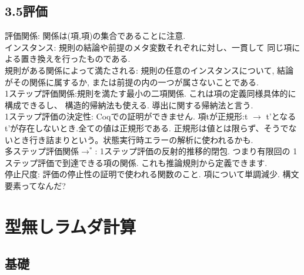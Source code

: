\documentclass[a4paper,10pt]{article}
\begin{document}
\subsection*{3.5評価}
評価関係: 関係は(項,項)の集合であることに注意.\\
インスタンス: 規則の結論や前提のメタ変数それぞれに対し、一貫して
同じ項による置き換えを行ったものである.\\
規則がある関係によって満たされる: 規則の任意のインスタンスについて,
結論がその関係に属するか, または前提の内の一つが属さないことである.\\
1ステップ評価関係:規則を満たす最小の二項関係. これは項の定義同様具体的に構成できるし、
構造的帰納法も使える. 導出に関する帰納法と言う. \\
1ステップ評価の決定性: Coqでの証明ができません.
項tが正規形:t $\rightarrow$ t'となるt'が存在しないとき.全ての値は正規形である. 
正規形は値とは限らず、そうでないとき行き詰まりという。状態実行時エラーの解析に使われるかも. \\
多ステップ評価関係$\rightarrow^*$: 1ステップ評価の反射的推移的閉包. つまり有限回の
1ステップ評価で到達できる項の関係. これも推論規則から定義できます. \\
停止尺度: 評価の停止性の証明で使われる関数のこと. 項について単調減少.
構文要素ってなんだ?
\section*{型無しラムダ計算}
\subsection*{基礎}
\end{document}
